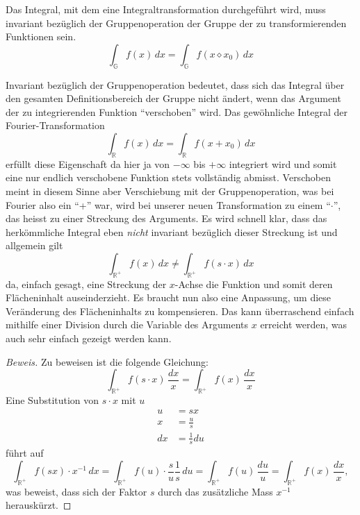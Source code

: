 \begin{definition}
    Das Integral, mit dem eine Integraltransformation durchgeführt wird, 
    muss invariant bezüglich der Gruppenoperation der Gruppe 
    der zu transformierenden Funktionen sein.
    \[
        \int_\mathbb{G} f(x)\,{d}x 
        = \int_\mathbb{G} f(x \diamond x_0)\,{d}x
    \]
\end{definition}


Invariant bezüglich der Gruppenoperation bedeutet, dass sich das Integral 
über den gesamten Definitionsbereich der Gruppe nicht ändert, wenn das 
Argument der zu integrierenden Funktion ``verschoben'' wird. 
Das gewöhnliche Integral der Fourier-Transformation 
\begin{equation}
    \int_\mathbb{R} f(x)\,{d}x 
    = \int_\mathbb{R} f(x + x_0)\,{d}x
\end{equation}
erfüllt diese Eigenschaft 
da hier ja von $-\infty$ bis $+\infty$ integriert wird und somit eine nur 
endlich verschobene Funktion stets vollständig abmisst.
Verschoben meint in diesem Sinne aber Verschiebung mit der Gruppenoperation, 
was bei Fourier also ein ``+'' war, wird bei unserer neuen Transformation 
zu einem ``$\cdot$'', das heisst zu einer Streckung des Arguments. 
Es wird schnell klar, dass das herkömmliche Integral eben {\em nicht} 
invariant bezüglich dieser Streckung ist und allgemein gilt 
\begin{equation}
    \int_\mathbb{R^+} 
    f(x)\,{d}x \neq \int_\mathbb{R^+} f(s \cdot x)\,{d}x
    \label{mellin:ungl}
\end{equation}
da, einfach gesagt, eine Streckung der $x$-Achse die Funktion und somit deren 
Flächeninhalt auseinderzieht.
Es braucht nun also eine Anpassung, um diese Veränderung des Flächeninhalts 
zu kompensieren.
Das kann überraschend einfach mithilfe einer Division durch die Variable 
des Arguments $x$ erreicht werden, was auch sehr einfach gezeigt werden 
kann.
\begin{proof}[Beweis]
    Zu beweisen ist die folgende Gleichung:
    \[
        \int_\mathbb{R^+} f(s \cdot x)\,\frac{{d}x}{x} 
        = \int_\mathbb{R^+} f(x)\,\frac{{d}x}{x}
    \]
    Eine Substitution von $s \cdot x$ mit $u$
    \begin{align*}
        u &= sx \\
        x &= \frac{u}{s} \\
        {d}x &= \frac{1}{s} {d}u
    \end{align*}
    führt auf
    \[
        \int_\mathbb{R^+} f(sx) \cdot x^{-1}\,{d}x 
        = \int_\mathbb{R^+} f(u) \cdot \frac{s}{u} \frac{1}{s}\,{d}u
        = \int_\mathbb{R^+} f(u)\,\frac{{d}u}{u}
        = \int_\mathbb{R^+} f(x)\,\frac{{d}x}{x}
        ,
    \]
    was beweist, dass sich der Faktor $s$ durch das zusätzliche Mass 
    $x^{-1}$ herauskürzt.
\end{proof}

